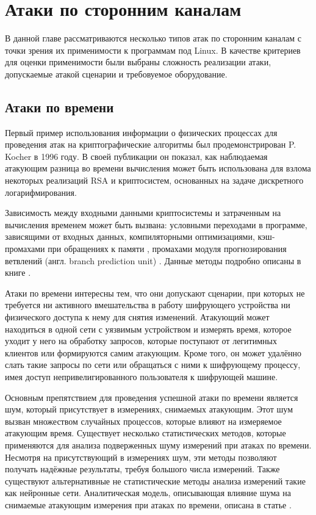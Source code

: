 \section{Атаки по сторонним каналам} \label{sec:sca}

В данной главе рассматриваются несколько типов атак по сторонним каналам с
точки зрения их применимости к программам под Linux. В качестве критериев
для оценки применимости были выбраны сложность реализации атаки, допускаемые
атакой сценарии и требовуемое оборудование.

\subsection{Атаки по времени}

Первый пример использования информации о физических процессах для проведения
атак на криптографические алгоритмы был продемонстрирован P. Kocher в 1996 году.
В своей публикации \cite{kocher} он показал, как наблюдаемая атакующим разница
во времени вычисления может быть использована для взлома некоторых реализаций
RSA и криптосистем, основанных на задаче дискретного логарифмирования.

Зависимость между входными данными криптосистемы и затраченным на вычисления
временем может быть вызвана: условными переходами в программе, зависящими от
входных данных, компиляторными оптимизациями, кэш-промахами при обращениях к
памяти \cite{bernstein}, промахами модуля прогнозирования ветвлений (англ.
branch prediction unit) \cite{bpa} \cite{sbpa}. Данные методы подробно описаны в
книге \cite{cren}.

Атаки по времени интересны тем, что они допускают сценарии, при которых
не требуется ни активного вмешательства в работу шифрующего устройства ни
физического доступа к нему для снятия изменений. Атакующий может находиться в
одной сети с уязвимым устройством и измерять время, которое уходит у него на
обработку запросов, которые поступают от легитимных клиентов или формируются
самим атакующим. Кроме того, он может удалённо слать такие запросы по сети
или обращаться с ними к шифрующему процессу, имея доступ непривелигированного
пользователя к шифрующей машине.

Основным препятствием для проведения успешной атаки по времени является шум,
который присутствует в измерениях, снимаемых атакующим. Этот шум вызван
множеством случайных процессов, которые влияют на измеряемое атакующим время.
Существует несколько статистических методов, которые применяются для анализа
подверженных шуму измерений при атаках по времени. Несмотря на присутствующий
в измерениях шум, эти методы позволяют получать надёжные результаты, требуя
большого числа измерений. Также существуют альтернативные не статистические
методы анализа измерений такие как нейронные сети. Аналитическая модель,
описывающая влияние шума на снимаемые атакующим измерения при атаках по времени,
описана в статье \cite{anmodel}.

